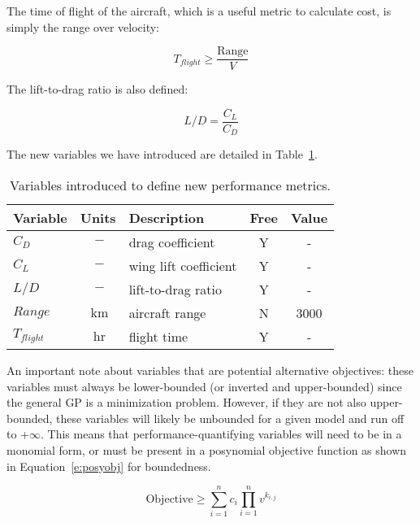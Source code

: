 The time of flight of the aircraft, which is a useful metric to calculate cost,
is simply the range over velocity:

\begin{equation}
    T_{flight} \geq \frac{\mathrm{Range}}{V}
\end{equation}

The lift-to-drag ratio is also defined: 

\begin{equation}
    L/D = \frac{C_L}{C_D}    
\end{equation}

The new variables we have introduced are detailed in Table~\ref{t:vars_perfMetrics}.

\begin{footnotesize}
\begin{table}
    \centering
    \begin{tabular}{ l c l c c }
        \toprule
        Variable & Units & Description & Free & Value \\
        \midrule
        $C_D$ & $~\mathrm{-}$ & drag coefficient & Y & - \\
        $C_L$ & $~\mathrm{-}$ & wing lift coefficient & Y & - \\
        $L/D$ & $~\mathrm{-}$ & lift-to-drag ratio & Y & - \\
        $Range$ & $~\mathrm{km}$ & aircraft range & N & 3000 \\
        $T_{flight}$ & $~\mathrm{hr}$ & flight time & Y & - \\
        \bottomrule
    \end{tabular}
    \caption{Variables introduced to define new performance metrics.}
    \label{t:vars_perfMetrics}
\end{table} \end{footnotesize}

An important note about variables that are potential alternative objectives: these variables
must always be lower-bounded (or inverted and upper-bounded) since the general \gls{GP} is a
minimization problem. However, if they are not also upper-bounded, these variables
will likely be unbounded for a given model and run off to +$\infty$. This means that
performance-quantifying variables will need to be in a monomial form,
or must be present in a posynomial objective
function as shown in Equation~\ref{e:posyobj} for boundedness.

\begin{equation}
    \mathrm{Objective} \geq \sum\limits^n_{i=1}c_{i}\prod\limits^n_{i=1}  v^{k_{i,j}}
    \label{e:posyobj}
\end{equation}

